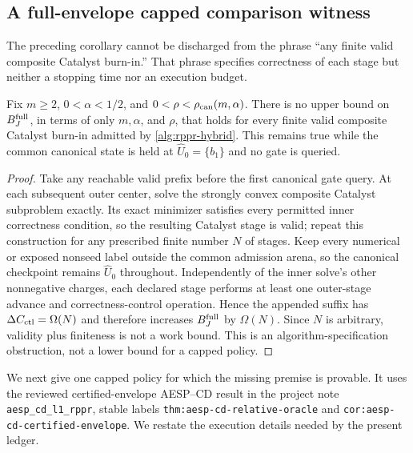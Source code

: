 \subsection{A full-envelope capped comparison witness}
\label{sec:branch-caterpillar-envelope-aesp-prefix}

The preceding corollary cannot be discharged from the phrase ``any finite
valid composite Catalyst burn-in.''  That phrase specifies correctness of
each stage but neither a stopping time nor an execution budget.

\begin{proposition}
\label{prop:branch-caterpillar-uncapped-prefix-obstruction}
Fix $m\geq2$, $0<\alpha<1/2$, and
$0<\rho<\rho_{\rm can}(m,\alpha)$.  There is no upper bound on
$B_J^{\rm full}$, in terms of only $m,\alpha$, and $\rho$, that holds for
every finite valid composite Catalyst burn-in admitted by
\cref{alg:rppr-hybrid}.  This remains true while the common canonical state
is held at $\widehat U_0=\{b_1\}$ and no gate is queried.
\end{proposition}

\begin{proof}
Take any reachable valid prefix before the first canonical gate query.  At
each subsequent outer center, solve the strongly convex composite Catalyst
subproblem exactly.  Its exact minimizer satisfies every permitted inner
correctness condition, so the resulting Catalyst stage is valid; repeat this
construction for any prescribed finite number $N$ of stages.  Keep every
numerical or exposed nonseed label outside the common admission arena, so the
canonical checkpoint remains $\widehat U_0$ throughout.  Independently of the
inner solve's other nonnegative charges, each declared stage performs at least
one outer-stage advance and correctness-control operation.  Hence the appended
suffix has $\Delta C_{\rm ctl}=\Omega(N)$ and therefore increases
$B_J^{\rm full}$ by $\Omega(N)$.  Since $N$ is arbitrary, validity plus
finiteness is not a work bound.  This is an algorithm-specification
obstruction, not a lower bound for a capped policy.
\end{proof}

We next give one capped policy for which the missing premise is provable.  It
uses the reviewed certified-envelope AESP--CD result in the project note
\texttt{aesp\_cd\_l1\_rppr}, stable labels
\texttt{thm:aesp-cd-relative-oracle} and
\texttt{cor:aesp-cd-certified-envelope}.  We restate the execution details
needed by the present ledger.

